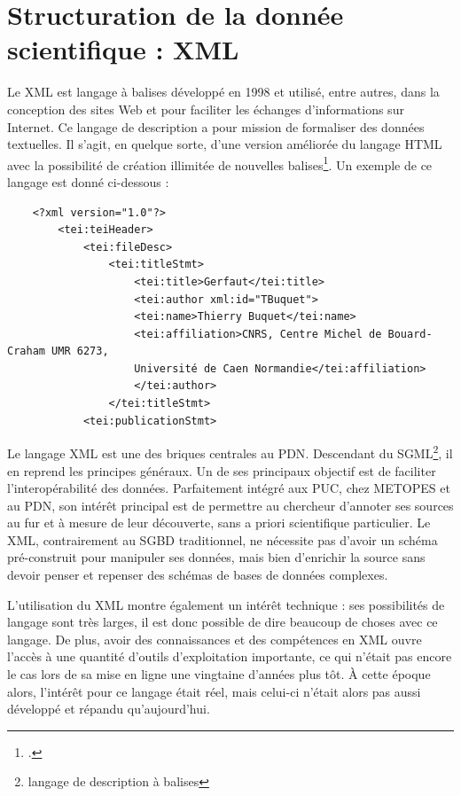 \documentclass[a4paper,12pt,twoside]{book}
\begin{document}
    \section{Structuration de la donnée scientifique : XML}
    
    Le \acrfull{XML} est langage à balises développé en  1998 et utilisé, entre autres, dans la conception des sites Web et pour faciliter les échanges d'informations sur Internet. Ce langage de description a pour mission de formaliser des données textuelles. Il s'agit, en quelque sorte, d'une version améliorée du langage HTML avec la possibilité de création illimitée de nouvelles balises\footcite{def-xml}. Un exemple de ce langage est donné ci-dessous :
    
    \begin{verbatim}
    <?xml version="1.0"?>
        <tei:teiHeader>
            <tei:fileDesc>
                <tei:titleStmt>
                    <tei:title>Gerfaut</tei:title>
                    <tei:author xml:id="TBuquet">
                    <tei:name>Thierry Buquet</tei:name>
                    <tei:affiliation>CNRS, Centre Michel de Bouard-Craham UMR 6273,
                    Université de Caen Normandie</tei:affiliation>
                    </tei:author>
                </tei:titleStmt>
            <tei:publicationStmt>
    \end{verbatim}
    
    Le langage \acrshort{XML} est une des briques centrales au \acrshort{PDN}. Descendant du \acrfull{SGML}\footnote{langage de description à balises}, il en reprend les principes généraux. Un de ses principaux objectif est de faciliter l'interopérabilité des données. Parfaitement intégré aux \acrshort{PUC}, chez \acrshort{METOPES} et au \acrshort{PDN}, son intérêt principal est de permettre au chercheur d'annoter ses sources au fur et à mesure de leur découverte, sans a priori scientifique particulier. Le \acrshort{XML}, contrairement au \acrfull{SGBD} traditionnel, ne nécessite pas d'avoir un schéma pré-construit pour manipuler ses données, mais bien d'enrichir la source sans devoir penser et repenser des schémas de bases de données complexes.
    
    L'utilisation du \acrshort{XML} montre également un intérêt technique : ses possibilités de langage sont très larges, il est donc possible de dire beaucoup de choses avec ce langage. De plus, avoir des connaissances et des compétences en XML ouvre l'accès à une quantité d'outils d'exploitation importante, ce qui n'était pas encore le cas lors de sa mise en ligne une vingtaine d'années plus tôt. À cette époque alors, l'intérêt pour ce langage était réel, mais celui-ci n'était alors pas aussi développé et répandu qu'aujourd'hui.
    
\end{document}
